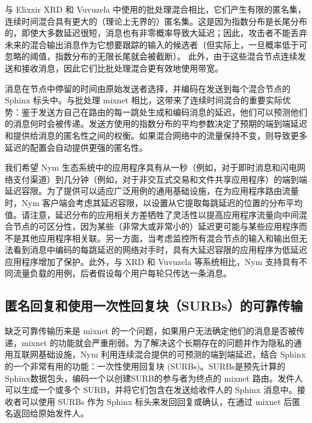 \documentclass{article}
\begin{document}
	与 Elixxir \cite{ref19} XRD \cite{ref70} 和 Vuvuzela \cite{ref103} 中使用的批处理混合相比，它们产生有限的匿名集，连续时间混合具有更大的（理论上无界的）匿名集。这是因为指数分布是长尾分布的，即使大多数延迟很短，消息也有非零概率导致大延迟；因此，攻击者不能丢弃未来的混合输出消息作为它想要跟踪的输入的候选者（但实际上，一旦概率低于可忽略的阈值，指数分布的无限长尾就会被截断）。 此外，由于这些混合节点连续发送和接收消息，因此它们比批处理混合更有效地使用带宽。\newline

	消息在节点中停留的时间由原始发送者选择，并编码在发送到每个混合节点的 Sphinx 标头中。与批处理 mixnet 相比，这带来了连续时间混合的重要实际优势：鉴于发送方自己在路由的每一跳处生成和编码消息的延迟，他们可以预测他们的消息何时会被传递。发送方使用的指数分布的平均参数决定了预期的端到端延迟和提供给消息的匿名性之间的权衡。如果混合网络中的流量保持不变，则导致更多延迟的配置会自动提供更强的匿名性。\newline

	我们希望 Nym 生态系统中的应用程序具有从一秒（例如，对于即时消息和闪电网络支付渠道）到几分钟（例如，对于非交互式交易和文件共享应用程序）的端到端延迟容限。为了提供可以适应广泛用例的通用基础设施，在为应用程序路由流量时，Nym 客户端会考虑其延迟容限，以设置从它提取每跳延迟的位置的分布平均值。请注意，延迟分布的应用相关方差牺牲了灵活性以提高应用程序流量向中间混合节点的可区分性，因为某些（非常大或非常小的）延迟更可能与某些应用程序而不是其他应用程序相关联。另一方面，当考虑监控所有混合节点的输入和输出但无法看到消息中编码的每跳延迟的网络对手时，具有大延迟容限的应用程序为低延迟应用程序增加了保护\cite{ref43}。此外，与 XRD \cite{ref70} 和 Vuvuzela \cite{ref103} 等系统相比，Nym 支持具有不同流量负载的用例，后者假设每个用户每轮只传达一条消息。\newline

	\subsection{匿名回复和使用一次性回复块（SURBs）的可靠传输}

	缺乏可靠传输历来是 mixnet 的一个问题，如果用户无法确定他们的消息是否被传递，mixnet 的功能就会严重削弱。为了解决这个长期存在的问题并作为隐私的通用互联网基础设施，Nym 利用连续混合提供的可预测的端到端延迟，结合 Sphinx 的一个非常有用的功能：一次性使用回复块 (SURBs)。SURBs是预先计算的Sphinx数据包头，编码一个以创建SURB的参与者为终点的 mixnet 路由。发件人可以生成一个或多个 SURB，并将它们包含在发送给收件人的 Sphinx 消息中。接收者可以使用 SURBs 作为 Sphinx 标头来发回回复或确认，在通过 mixnet 后匿名返回给原始发件人。\newline
\end{document}
